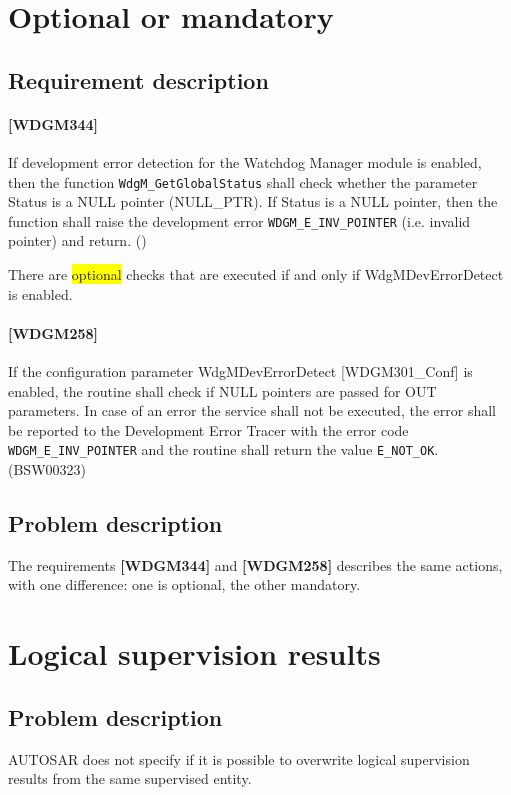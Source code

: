 \section{Optional or mandatory}
\subsection{Requirement description}
\paragraph{[WDGM344]} If development error detection for the Watchdog
Manager module is enabled, then the function \lstinline!WdgM_GetGlobalStatus!
shall check whether the parameter Status is a NULL pointer
(NULL\_PTR). If Status is a NULL pointer, then the function shall raise
the development error \lstinline!WDGM_E_INV_POINTER! (i.e. invalid pointer) and
return.  ()

There are \colorbox{yellow}{optional} checks that are executed if and
only if WdgMDevErrorDetect is enabled.
\paragraph{[WDGM258]} If the configuration parameter WdgMDevErrorDetect
[WDGM301\_Conf] is enabled, the routine shall check if NULL pointers
are passed for OUT parameters. In case of an error the service shall
not be executed, the error shall be reported to the Development Error
Tracer with the error code \lstinline!WDGM_E_INV_POINTER! and the routine shall
return the value \lstinline!E_NOT_OK!.  (BSW00323)

\subsection{Problem description}
The requirements \textbf{[WDGM344]} and \textbf{[WDGM258]} describes
the same actions, with one difference: one is optional, the other mandatory.

\section{Logical supervision results}
\subsection{Problem description}
AUTOSAR does not specify if it is possible to overwrite logical supervision
results from the same supervised entity.

